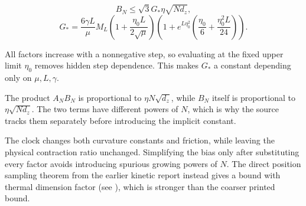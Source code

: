 \documentclass[11pt,a4paper]{article}
\begin{document}
\[B_N\le\sqrt3G_*\eta\sqrt{Nd_z},\]
\[G_*=\frac{6\gamma L}{\mu}M_L
\left(1+\frac{\eta_0L}{2\sqrt\mu}\right)
\left(1+e^{L\eta_0^2}
\left(\frac{\eta_0}{6}+\frac{\eta_0^2L}{24}\right)\right).\]


All factors increase with a nonnegative step, so evaluating at the fixed
upper limit \(\eta_0\) removes hidden step dependence. This makes \(G_*\)
a constant depending only on \(\mu,L,\gamma\).




The product \(A_NB_N\) is proportional to \(\eta N\sqrt{d_z}\), while
\(B_N\) itself is proportional to \(\eta\sqrt{Nd_z}\). The two terms have
different powers of \(N\), which is why the source tracks them separately
before introducing the implicit constant.



The clock changes both curvature constants and friction, while leaving the physical contraction ratio unchanged. Simplifying the bias only after substituting every factor avoids introducing spurious growing powers of \(N\). The direct position sampling theorem from the earlier kinetic report instead gives a bound with thermal dimension factor (see \cite[Section~3.123.4]{LangevinLean2026Kinetic}), which is stronger than the coarser printed bound.
\end{document}
